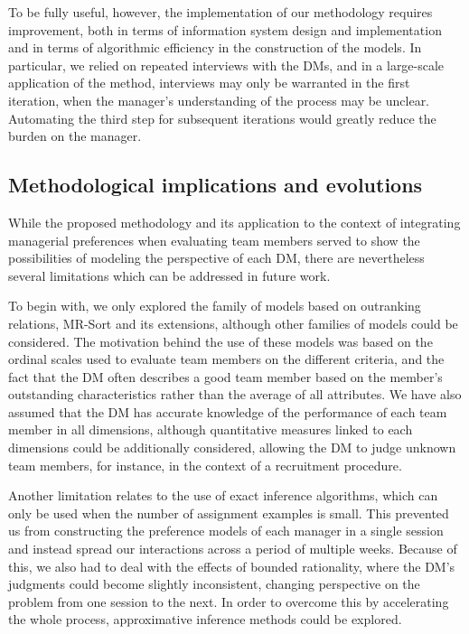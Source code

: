 To be fully useful, however, the implementation of our methodology requires improvement, both in terms of information system design and implementation and in terms of algorithmic efficiency in the construction of the models. In particular, we relied on repeated interviews with the DMs, and in a large-scale application of the method, interviews may only be warranted in the first iteration, when the manager's understanding of the process may be unclear. Automating the third step for subsequent iterations would greatly reduce the burden on the manager.

\subsection{Methodological implications and evolutions}\label{subsec:Methodofindings}

While the proposed methodology and its application to the context of integrating managerial preferences when evaluating team members served to show the possibilities of modeling the perspective of each DM, there are nevertheless several limitations which can be addressed in future work.

To begin with, we only explored the family of models based on outranking relations, MR-Sort and its extensions, although other families of models could be considered. The motivation behind the use of these models was based on the ordinal scales used to evaluate team members on the different criteria, and the fact that the DM often describes a good team member based on the member's outstanding characteristics rather than the average of all attributes. We have also assumed that the DM has accurate knowledge of the performance of each team member in all dimensions, although quantitative measures linked to each dimensions could be additionally considered, allowing the DM to judge unknown team members, for instance, in the context of a recruitment procedure.

Another limitation relates to the use of exact inference algorithms, which can only be used when the number of assignment examples is small. This prevented us from constructing the preference models of each manager in a single session and instead spread our interactions across a period of multiple weeks. Because of this, we also had to deal with the effects of bounded rationality, where the DM's judgments could become slightly inconsistent, changing perspective on the problem from one session to the next. In order to overcome this by accelerating the whole process, approximative inference methods could be explored.

